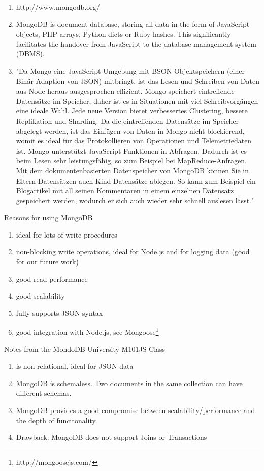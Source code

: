 \begin{enumerate}
\item http://www.mongodb.org/
\item MongoDB is document database, storing all data in the form of JavaScript objects, PHP arrays, Python dicts or Ruby hashes. This significantly facilitates the handover from JavaScript to the database management system (DBMS).
\item "Da Mongo eine JavaScript-Umgebung mit BSON-Objektspeichern (einer Bin\"ar-Adaption von JSON) mitbringt, ist das Lesen und Schreiben von Daten aus Node heraus ausgesprochen effizient. Mongo speichert eintreffende Datens\"atze im Speicher, daher ist es in Situationen mit viel Schreibvorg\"angen eine ideale Wahl. Jede neue Version bietet verbessertes Clustering, bessere Replikation und Sharding. Da die eintreffenden Datens\"atze im Speicher abgelegt werden, ist das Einf\"ugen von Daten in Mongo nicht blockierend, womit es ideal f\"ur das Protokollieren von Operationen und Telemetriedaten ist. Mongo unterst\"utzt JavaScript-Funktionen in Abfragen. Dadurch ist es beim Lesen sehr leistungsf\"ahig, so zum Beispiel bei MapReduce-Anfragen. Mit dem dokumentenbasierten Datenspeicher von MongoDB k\"onnen Sie in Eltern-Datens\"atzen auch Kind-Datens\"atze ablegen. So kann zum Beispiel ein Blogartikel mit all seinen Kommentaren in einem einzelnen Datensatz gespeichert werden, wodurch er sich auch wieder sehr schnell auslesen l\"asst."  \cite{hughes2012einfuhrung}
\end{enumerate}

Reasons for using MongoDB
\begin{enumerate}
\item ideal for lots of write procedures
\item non-blocking write operations, ideal for Node.js and for logging data (good for our future work)
\item good read performance
\item good scalability
\item fully supports JSON syntax
\item good integration with Node.js, see Mongoose\footnote{http://mongoosejs.com/}
\end{enumerate}


Notes from the MondoDB University M101JS Class
\begin{enumerate}
\item is non-relational, ideal for JSON data
\item MongoDB is schemaless. Two documents in the same collection can have different schemas.
\item MongoDB provides a good compromise between scalability/performance and the depth of funcitonality
\item Drawback: MongoDB does not support Joins or Transactions
\end{enumerate}

